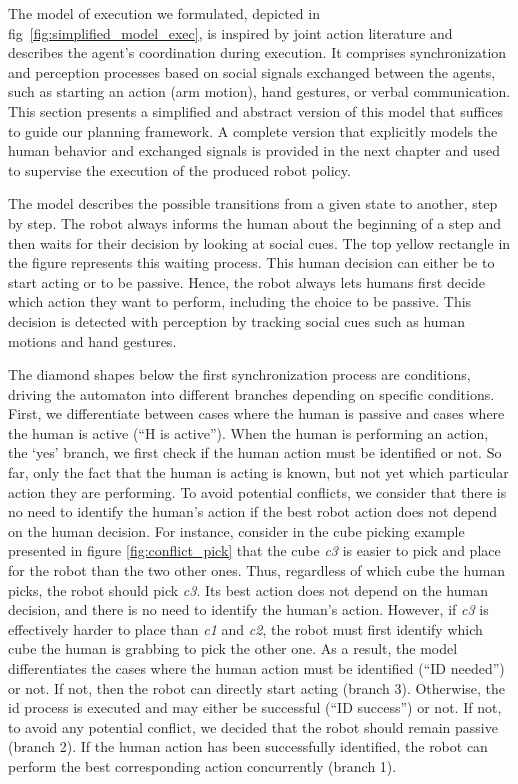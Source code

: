
The model of execution we formulated, depicted in fig~\ref{fig:simplified_model_exec}, is inspired by joint action literature and describes the agent's coordination during execution. It comprises synchronization and perception processes based on social signals exchanged between the agents, such as starting an action (arm motion), hand gestures, or verbal communication. This section presents a simplified and abstract version of this model that suffices to guide our planning framework. A complete version that explicitly models the human behavior and exchanged signals is provided in the next chapter and used to supervise the execution of the produced robot policy.  


The model describes the possible transitions from a given state to another, step by step. The robot always informs the human about the beginning of a step and then waits for their decision by looking at social cues. The top yellow rectangle in the figure represents this waiting process. This human decision can either be to start acting or to be passive. Hence, the robot always lets humans first decide which action they want to perform, including the choice to be passive. This decision is detected with perception by tracking social cues such as human motions and hand gestures.

The diamond shapes below the first synchronization process are conditions, driving the automaton into different branches depending on specific conditions. First, we differentiate between cases where the human is passive and cases where the human is active (``H is active''). 
When the human is performing an action, the `yes' branch, we first check if the human action must be identified or not. So far, only the fact that the human is acting is known, but not yet which particular action they are performing. 
To avoid potential conflicts, we consider that there is no need to identify the human's action if the best robot action does not depend on the human decision. For instance, consider in the cube picking example presented in figure \ref{fig:conflict_pick} that the cube \emph{c3} is easier to pick and place for the robot than the two other ones. Thus, regardless of which cube the human picks, the robot should pick \emph{c3}. Its best action does not depend on the human decision, and there is no need to identify the human's action. However, if \emph{c3} is effectively harder to place than \emph{c1} and \emph{c2}, the robot must first identify which cube the human is grabbing to pick the other one. As a result, the model differentiates the cases where the human action must be identified (``ID needed'') or not. If not, then the robot can directly start acting (branch 3). Otherwise, the \acrfull{id} process is executed and may either be successful (``ID success'') or not. If not, to avoid any potential conflict, we decided that the robot should remain passive (branch 2). If the human action has been successfully identified, the robot can perform the best corresponding action concurrently (branch 1).

